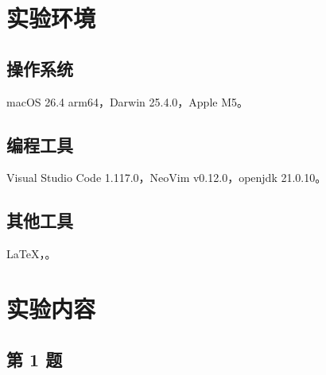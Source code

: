 \documentclass{academics}
\begin{document}
\makeacademicscover

\section{实验环境}

\subsection{操作系统}

macOS 26.4 arm64，Darwin 25.4.0，Apple M5。

\subsection{编程工具}

Visual Studio Code 1.117.0，NeoVim v0.12.0，openjdk 21.0.10。

\subsection{其他工具}

\LaTeX{}，。

\section{实验内容}

\subsection{第 1 题}
\end{document}
